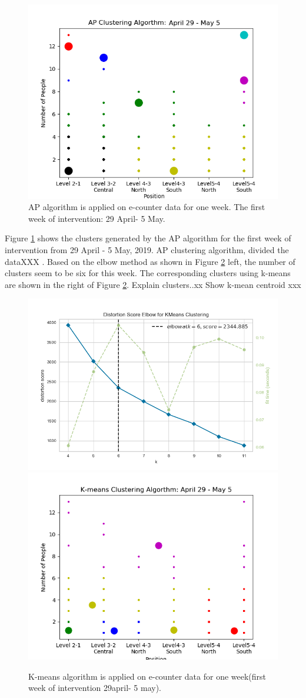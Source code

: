\documentclass[../UNBThesis2.tex]{subfiles}
\begin{document}
\begin{figure}[!h]
    \centering
    \includegraphics[width = 11 cm]{image/Chapters/Chapter6/ApFirstWeekIntervention.png}
    \caption{AP algorithm is applied on e-counter data for one week. The first week of intervention: 29 April- 5 May.}
    \label{oneweek}
\end{figure}
    
Figure \ref{oneweek} shows the clusters generated by the AP algorithm for the first week of intervention from 29 April - 5 May, 2019. AP clustering algorithm, divided the dataXXX .
Based on the elbow method as shown in Figure \ref{elbkmean} left, the number of clusters seem to be six for this week. The corresponding clusters using k-means  are shown in the right of Figure \ref{elbkmean}. Explain clusters..xx Show k-mean centroid xxx
    
    
\begin{figure}[!h]
    \centering
    \includegraphics[width=.5\textwidth]{image/Chapters/Chapter6/elbow.png}%
    \includegraphics[width=.5\textwidth]{image/Chapters/Chapter6/kmeans_oneweek6Cluster.png}%
    \caption{K-means algorithm is applied on e-counter data for one week(first week of intervention 29april- 5 may).}
    \label{elbkmean}
\end{figure}    
\end{document}
